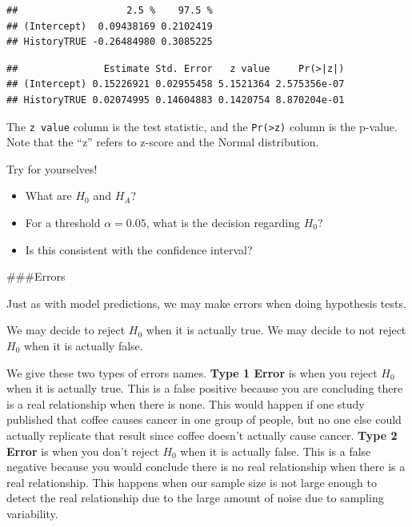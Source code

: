 \documentclass[]{book}
\newenvironment{Shaded}{\begin{snugshade}}{\end{snugshade}}
\newcommand{\KeywordTok}[1]{\textcolor[rgb]{0.13,0.29,0.53}{\textbf{#1}}}
\newcommand{\NormalTok}[1]{#1}
\newcommand{\OperatorTok}[1]{\textcolor[rgb]{0.81,0.36,0.00}{\textbf{#1}}}
\providecommand{\tightlist}{%
  \setlength{\itemsep}{0pt}\setlength{\parskip}{0pt}}
\begin{document}
\begin{verbatim}
##                   2.5 %    97.5 %
## (Intercept)  0.09438169 0.2102419
## HistoryTRUE -0.26484980 0.3085225
\end{verbatim}

\begin{Shaded}
\end{Shaded}

\begin{verbatim}
##               Estimate Std. Error   z value     Pr(>|z|)
## (Intercept) 0.15226921 0.02955458 5.1521364 2.575356e-07
## HistoryTRUE 0.02074995 0.14604883 0.1420754 8.870204e-01
\end{verbatim}

The \texttt{z\ value} column is the test statistic, and the \texttt{Pr(\textgreater{}\textbar{}z\textbar{})} column is the p-value. Note that the ``z'' refers to z-score and the Normal distribution.

Try for yourselves!

\begin{itemize}
\tightlist
\item
  What are \(H_0\) and \(H_A\)?
\item
  For a threshold \(\alpha = 0.05\), what is the decision regarding \(H_0\)?
\item
  Is this consistent with the confidence interval?
\end{itemize}

\#\#\#Errors

Just as with model predictions, we may make errors when doing hypothesis tests.

We may decide to reject \(H_0\) when it is actually true. We may decide to not reject \(H_0\) when it is actually false.

We give these two types of errors names. \textbf{Type 1 Error} is when you reject \(H_0\) when it is actually true. This is a false positive because you are concluding there is a real relationship when there is none. This would happen if one study published that coffee causes cancer in one group of people, but no one else could actually replicate that result since coffee doesn't actually cause cancer. \textbf{Type 2 Error} is when you don't reject \(H_0\) when it is actually false. This is a false negative because you would conclude there is no real relationship when there is a real relationship. This happens when our sample size is not large enough to detect the real relationship due to the large amount of noise due to sampling variability.
\end{document}
